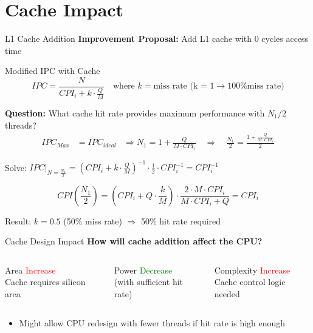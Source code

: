 \documentclass[aspectratio=169,12pt]{beamer}
\begin{document}
\section{Cache Impact}

\begin{frame}{L1 Cache Addition}
\textbf{Improvement Proposal:} Add L1 cache with 0 cycles access time

\begin{block}{Modified IPC with Cache}
$$IPC = \frac{N}{CPI_i + k \cdot \frac{Q}{M}} \quad \text{where } k = \text{miss rate (k = 1} \rightarrow \text{100\% miss rate)}$$
\end{block}

\textbf{Question:} What cache hit rate provides maximum performance with $N_1/2$ threads?
\begin{align*}
IPC_{Max} &= IPC_{ideal} & \Rightarrow N_1 = 1 + \frac{Q}{M \cdot CPI_i} \quad \Rightarrow \quad \frac{N_1}{2} = \frac{1 + \frac{Q}{M \cdot CPI_i}}{2}
\end{align*}

Solve: $IPC\Big|_{N=\frac{N_1}{2}} = \left(CPI_i + k \cdot \frac{Q}{M}\right)^{-1} \cdot \frac{1}{2} \cdot CPI_i^{-1} = CPI_i^{-1}$

\begin{tcolorbox}[colback=blue!5!white,colframe=blue!75!black]
$$CPI\left(\frac{N_1}{2}\right) = \left(CPI_i + Q \cdot \frac{k}{M}\right) \cdot \frac{2 \cdot M \cdot CPI_i}{M \cdot CPI_i + Q} = CPI_i$$
\end{tcolorbox}

\alert{Result: $k = 0.5$ (50\% miss rate) $\Rightarrow$ 50\% hit rate required}
\end{frame}

\begin{frame}{Cache Design Impact}
\textbf{How will cache addition affect the CPU?}

\begin{columns}
\begin{block}{Area}
\textcolor{red}{Increase} \\
Cache requires silicon area
\end{block}

\begin{block}{Power}
\textcolor{green}{Decrease} \\
(with sufficient hit rate)
\end{block}

\begin{block}{Complexity}
\textcolor{red}{Increase} \\
Cache control logic needed
\end{block}
\end{columns}

\vspace{0.5cm}
\begin{itemize}
    \item Might allow CPU redesign with fewer threads if hit rate is high enough
\end{itemize}
\end{frame}
\end{document}

